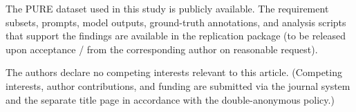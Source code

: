 \documentclass[sn-mathphys-num]{sn-jnl}
\begin{document}
\backmatter

The PURE dataset used in this study is publicly available. The requirement subsets, prompts, model outputs, ground-truth annotations, and analysis scripts that support the findings are available in the replication package (to be released upon acceptance / from the corresponding author on reasonable request).

The authors declare no competing interests relevant to this article. (Competing interests, author contributions, and funding are submitted via the journal system and the separate title page in accordance with the double-anonymous policy.)


\end{document}
